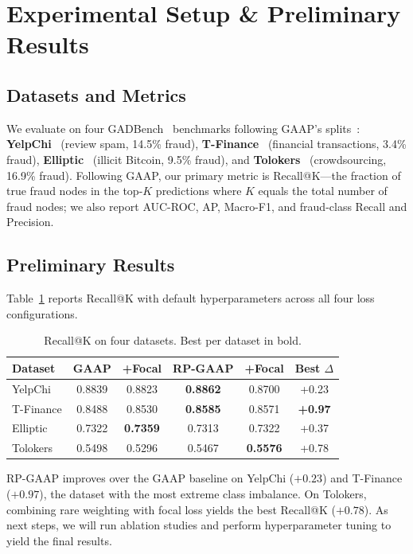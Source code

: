 \section{Experimental Setup \& Preliminary Results}
\label{sec:experiments}

\subsection{Datasets and Metrics}

We evaluate on four GADBench~\cite{tang2024gadbench} benchmarks following GAAP's splits~\cite{duan2025gaap}: \textbf{YelpChi}~\cite{rayana2015collective} (review spam, 14.5\% fraud), \textbf{T-Finance}~\cite{tang2022rethinking} (financial transactions, 3.4\% fraud), \textbf{Elliptic}~\cite{weber2019elliptic} (illicit Bitcoin, 9.5\% fraud), and \textbf{Tolokers}~\cite{platonov2023tolokers} (crowdsourcing, 16.9\% fraud). Following GAAP, our primary metric is Recall@K---the fraction of true fraud nodes in the top-$K$ predictions where $K$ equals the total number of fraud nodes; we also report AUC-ROC, AP, Macro-F1, and fraud-class Recall and Precision.

\subsection{Preliminary Results}

Table~\ref{tab:prelim} reports Recall@K with default hyperparameters across all four loss configurations.

\begin{table}[h]
\centering
\caption{Recall@K on four datasets. Best per dataset in bold.}
\label{tab:prelim}
\begin{tabular}{lcccc|c}
\toprule
Dataset & GAAP & +Focal & RP-GAAP & +Focal & Best $\Delta$ \\
\midrule
YelpChi     & 0.8839 & 0.8823 & \textbf{0.8862} & 0.8700 & +0.23 \\
T-Finance   & 0.8488 & 0.8530 & \textbf{0.8585} & 0.8571 & \textbf{+0.97} \\
Elliptic    & 0.7322 & \textbf{0.7359} & 0.7313 & 0.7322 & +0.37 \\
Tolokers    & 0.5498 & 0.5296 & 0.5467 & \textbf{0.5576} & +0.78 \\
\bottomrule
\end{tabular}
\end{table}

RP-GAAP improves over the GAAP baseline on YelpChi ($+0.23$) and T-Finance ($+0.97$), the dataset with the most extreme class imbalance. On Tolokers, combining rare weighting with focal loss yields the best Recall@K ($+0.78$). As next steps, we will run ablation studies and perform hyperparameter tuning to yield the final results.
